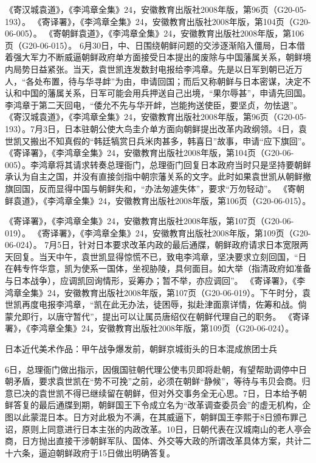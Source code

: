 \documentclass[12pt,UTF8]{ctexbook}
\begin{document}
《寄汉城袁道》，《李鸿章全集》24，安徽教育出版社2008年版，第96页（G20-05-193）。
《寄译署》，《李鸿章全集》24，安徽教育出版社2008年版，第104页（G20-06-005）。
《寄朝鲜袁道》，《李鸿章全集》24，安徽教育出版社2008年版，第106页（G20-06-015）。
6月30日，中、日围绕朝鲜问题的交涉逐渐陷入僵局，日本借着强大军力不断威逼朝鲜政府单方面接受日本提出的废除与中国藩属关系，朝鲜境内局势日益紧张。当天，袁世凯连发数封电报给李鸿章。先是以日军到朝已近万人，“各处布置，待与华寻衅”为由，申请回国；而后又称朝鲜与日本密谋，决定不认和中国的藩属关系，日军可能会用兵押送自己出境，“果尔辱甚”，申请先回国。李鸿章于第二天回电，“倭允不先与华开衅，岂能拘送使臣，要坚贞，勿怯退”。 《寄汉城袁道》，《李鸿章全集》24，安徽教育出版社2008年版，第96页（G20-05-193）。7月3日，日本驻朝公使大鸟圭介单方面向朝鲜提出改革内政纲领。4日，袁世凯又搬出不知真假的“韩廷犒赏日兵米肉甚多，韩喜日”故事，申请“应下旗回”。 《寄译署》，《李鸿章全集》24，安徽教育出版社2008年版，第104页（G20-06-005）。李鸿章将其请求转奏总理衙门，总理衙门回复日本政府当时只是坚持要朝鲜承认为自主之国，并没有直接剑指中朝宗藩关系的文字。此时如果袁世凯从朝鲜撤旗回国，反而显得中国与朝鲜失和，“办法匆遽失体”，要求“万勿轻动”。 《寄朝鲜袁道》，《李鸿章全集》24，安徽教育出版社2008年版，第106页（G20-06-015）。

《寄译署》，《李鸿章全集》24，安徽教育出版社2008年版，第107页（G20-06-019）。
《寄译署》，《李鸿章全集》24，安徽教育出版社2008年版，第109页（G20-06-024）。
7月5日，针对日本要求改革内政的最后通牒，朝鲜政府请求日本宽限两天回复。当天中午，袁世凯显得惊慌不已，致电李鸿章，坚决要求立刻回国，“日在韩专忤华意，凯为使系一国体，坐视胁陵，具何面目。如大举（指清政府如准备与日本战争），应调凯回询情形，妥筹办；暂不举，亦应调回”。 《寄译署》，《李鸿章全集》24，安徽教育出版社2008年版，第107页（G20-06-019）。下午时分，袁世凯再度电报李鸿章，“凯在此无办法，徒困辱，拟赴津面禀详情，佐筹和战。倘蒙允即行，以唐守暂代”，提出可以让属员唐绍仪在朝鲜代理自己的职务。 《寄译署》，《李鸿章全集》24，安徽教育出版社2008年版，第109页（G20-06-024）。


日本近代美术作品：甲午战争爆发前，朝鲜京城街头的日本混成旅团士兵

6日，总理衙门做出指示，因俄国驻朝代理公使韦贝即将赴朝，有望帮助调停中日朝矛盾，要求袁世凯在“势不可挽”之前，必须在朝鲜“静候”，等待与韦贝会商。归意已决的袁世凯不得已继续留在朝鲜，但对外交事务全无心思。7日，日本给予朝鲜答复的最后通牒到期，朝鲜国王下令成立名为“改革调查委员会”的虚无机构，企图以此蒙混日本。日方对此极为不满，在其威逼下，朝鲜国王李熙于8日颁布罪己诏，原则上同意进行日本主张的内政改革。10日，日朝代表在汉城南山的老人亭会商，日方抛出直接干涉朝鲜军队、国体、外交等大政的所谓改革具体方案，共计二十六条，逼迫朝鲜政府于15日做出明确答复。
\end{document}
